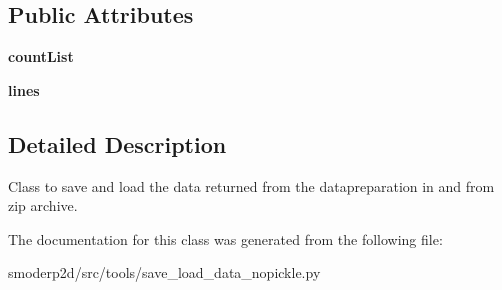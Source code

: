 \subsection*{Public Attributes}
\begin{DoxyCompactItemize}
\item 
\hypertarget{classsmoderp2d_1_1src_1_1tools_1_1save__load__data__nopickle_1_1SaveLoad_ad3bed899b380199e62bed31b6d40f0f2}{{\bfseries count\-List}}\label{classsmoderp2d_1_1src_1_1tools_1_1save__load__data__nopickle_1_1SaveLoad_ad3bed899b380199e62bed31b6d40f0f2}

\item 
\hypertarget{classsmoderp2d_1_1src_1_1tools_1_1save__load__data__nopickle_1_1SaveLoad_a3101022a38b6b958d8a05909b71208fb}{{\bfseries lines}}\label{classsmoderp2d_1_1src_1_1tools_1_1save__load__data__nopickle_1_1SaveLoad_a3101022a38b6b958d8a05909b71208fb}

\end{DoxyCompactItemize}


\subsection{Detailed Description}
Class to save and load the data returned from the datapreparation in and from zip archive. 

The documentation for this class was generated from the following file\-:\begin{DoxyCompactItemize}
\item 
smoderp2d/src/tools/save\-\_\-load\-\_\-data\-\_\-nopickle.\-py\end{DoxyCompactItemize}
